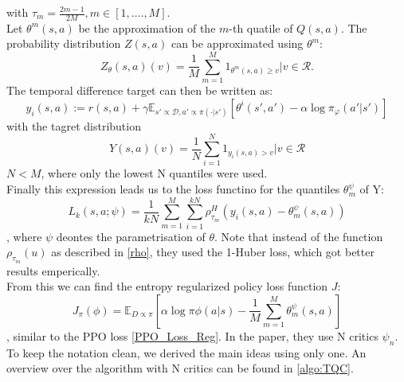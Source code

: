 with ${\tau_m = \frac{2m-1}{2M}}, m \in [1, ...., M]$.\\
Let $\theta^m(s,a)$ be the approximation of the $m$-th quatile of $Q(s,a)$. The probability distribution $Z(s,a)$ can be approximated using $\theta^m$:
\begin{equation}
    Z_{\theta}(s,a) (v) = \frac{1}{M} \sum_{m=1}^M 1_{\theta^m(s,a) \geq v} | v\in\mathcal{R}.
\end{equation}
The temporal difference target can then be written as:
\begin{equation}
    y_i(s,a) := r(s,a) + \gamma \mathbb{E}_{s' \propto \mathcal{D}, a' \propto \pi(\cdot|s')}[\theta^i(s',a') - \alpha \log \pi_{\varphi}(a'|s')]
\end{equation}
with the tagret distribution
\begin{equation}
    Y(s,a)(v) = \frac{1}{N} \sum_{i=1}^N 1_{y_i(s,a) > v} | v \in \mathcal{R}
\end{equation}
$N<M$, where only the lowest N quantiles were used. \\
Finally this expression leads us to the loss functino for the quantiles $\theta_m^{\psi}$ of Y:
\begin{equation}
    L_k(s,a;\psi) = \frac{1}{kN}\sum_{m=1}^{M}\sum_{i=1}^{kN}\rho^H_{\tau_m} \left(y_i(s,a) - \theta_m^{\psi}(s,a)\right)
\end{equation}
, where $\psi$ deontes the parametrisation of $\theta$. Note that instead of the function $\rho_{\tau_m}(u)$ as described in \ref{rho}, they used the 
1-Huber loss, which got better results emperically. \\
From this we can find the entropy regularized policy loss function $J$:
\begin{equation}
    J_\pi(\phi) = \mathbb{E}_{D \propto \pi}\left[\alpha\log\pi{\phi}(a|s) - \frac{1}{M}\sum_{m=1}^{M}\theta_m^{\psi}(s,a)\right]
\end{equation}
, similar to the PPO loss \ref{PPO_Loss_Reg}. In the paper, they use N critics $\psi_n$. To keep the notation clean, we derived the main ideas using only one. An 
overview over the algorithm with N critics can be found in \ref{algo:TQC}.

